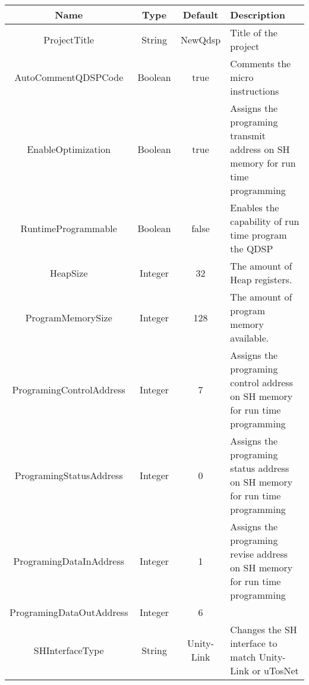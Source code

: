 \begin{tabular}{c|c|c|p{6.6cm}}
	\textbf{Name} & \textbf{Type} & \textbf{Default} & \textbf{Description}\\
	\hline
	ProjectTitle & String & NewQdsp & Title of the project\\
	AutoCommentQDSPCode & Boolean & true & Comments the micro instructions\\
	EnableOptimization & Boolean & true & Assigns the programing transmit address on SH memory for run time programming\\
	RuntimeProgrammable & Boolean & false & Enables the capability of run time program the QDSP\\
	HeapSize\footnotemark\addtocounter{footnote}{-1}\addtocounter{Hfootnote}{-1} & Integer & 32 & The amount of Heap registers.\\
	ProgramMemorySize\footnotemark\addtocounter{footnote}{-1}\addtocounter{Hfootnote}{-1} & Integer & 128 & The amount of program memory available.\\
	ProgramingControlAddress\footnotemark\addtocounter{footnote}{-1}\addtocounter{Hfootnote}{-1} & Integer & 7 & Assigns the programing control address on SH memory for run time programming\\
	ProgramingStatusAddress\footnotemark\addtocounter{footnote}{-1}\addtocounter{Hfootnote}{-1} & Integer & 0 & Assigns the programing status address on SH memory for run time programming\\
	ProgramingDataInAddress\footnotemark\addtocounter{footnote}{-1}\addtocounter{Hfootnote}{-1} & Integer & 1 & Assigns the programing revise address on SH memory for run time programming\\
	ProgramingDataOutAddress\footnotemark\addtocounter{footnote}{-1}\addtocounter{Hfootnote}{-1} & Integer & 6 & \\
	SHInterfaceType\footnotemark & String & Unity-Link & Changes the SH interface to match Unity-Link or uTosNet \\
\end{tabular}
